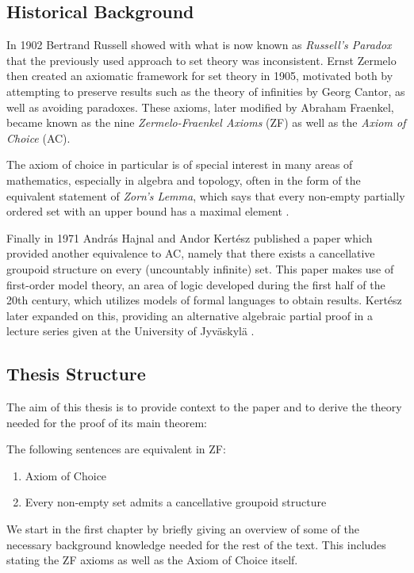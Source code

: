 \documentclass[../../main.tex]{subfiles}
\begin{document}
\subsection*{Historical Background}

In 1902 Bertrand Russell showed with what is now known as \textit{Russell's Paradox} that the previously used approach to set theory was inconsistent.
Ernst Zermelo then created an axiomatic framework for set theory in 1905, motivated both by attempting to preserve results such as the theory of infinities by Georg Cantor, as well as avoiding paradoxes.
These axioms, later modified by Abraham Fraenkel, became known as the nine \textit{Zermelo-Fraenkel Axioms} (ZF) as well as the \textit{Axiom of Choice} (AC)\cite[pp.66-70, 75]{Gol17}.

The axiom of choice in particular is of special interest in many areas of mathematics, especially in algebra and topology, often in the form of the equivalent statement of \textit{Zorn's Lemma},
which says that every non-empty partially ordered set with an upper bound has a maximal element \cite{Jec78}.

Finally in 1971 András Hajnal and Andor Kertész published a paper \cite{Haj72} which provided another equivalence to AC, namely that there exists a cancellative groupoid structure on every (uncountably infinite) set.
This paper makes use of first-order model theory, an area of logic developed during the first half of the 20th century, which utilizes models of formal languages to obtain results.
Kertész later expanded on this, providing an alternative algebraic partial proof in a lecture series given at the University of Jyväskylä \cite{Ker75}.

\subsection*{Thesis Structure}

The aim of this thesis is to provide context to the paper \cite{Haj72} and to derive the theory needed for the proof of its main theorem:
\begin{theorem}
    The following sentences are equivalent in ZF:
    \begin{enumerate}
        \item Axiom of Choice
        \item Every non-empty set admits a cancellative groupoid structure
    \end{enumerate}
\end{theorem}
We start in the first chapter by briefly giving an overview of some of the necessary background knowledge needed for the rest of the text.
This includes stating the ZF axioms as well as the Axiom of Choice itself.
\end{document}
